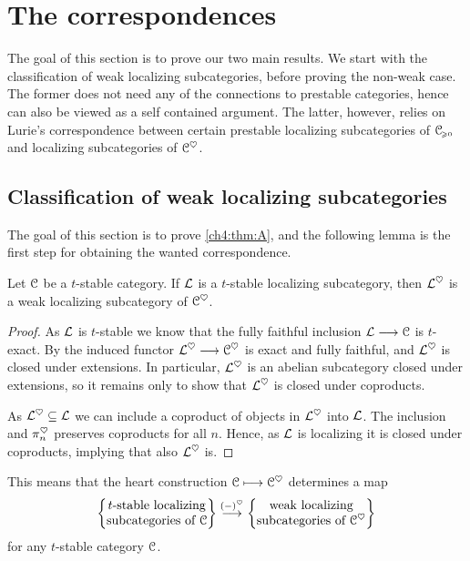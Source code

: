 

\section{The correspondences}

The goal of this section is to prove our two main results. We start with the classification of weak localizing subcategories, before proving the non-weak case. The former does not need any of the connections to prestable categories, hence can also be viewed as a self contained argument. The latter, however, relies on Lurie's correspondence between certain prestable localizing subcategories of $\EuScript{C}_{\hspace{-1pt}\scriptscriptstyle\geqslant 0}$ and localizing subcategories of $\EuScript{C}^\heartsuit$. 


\subsection{Classification of weak localizing subcategories}
\label{ch4:ssec:classificartion-weak-localizing}

The goal of this section is to prove \cref{ch4:thm:A}, and the following lemma is the first step for obtaining the wanted correspondence. 

\begin{lemma}
    \label{ch4:lm:t-stable-then-weak-localizing-heart}
    Let $\EuScript{C}$ be a $t$-stable category. If $\mathcal{L}$ is a $t$-stable localizing subcategory, then $\mathcal{L}^\heartsuit$ is a weak localizing subcategory of $\EuScript{C}^\heartsuit$. 
\end{lemma}
\begin{proof}
    As $\mathcal{L}$ is $t$-stable we know that the fully faithful inclusion $\mathcal{L}\longrightarrow \EuScript{C}$ is $t$-exact. By \cite[2.19]{antieau-gepner-heller_2019} the induced functor $\mathcal{L}^\heartsuit\longrightarrow\EuScript{C}^\heartsuit$ is exact and fully faithful, and $\mathcal{L}^\heartsuit$ is closed under extensions. In particular, $\mathcal{L}^\heartsuit$ is an abelian subcategory closed under extensions, so it remains only to show that $\mathcal{L}^\heartsuit$ is closed under coproducts.

    As $\mathcal{L}^\heartsuit \subseteq \mathcal{L}$ we can include a coproduct of objects in $\mathcal{L}^\heartsuit$ into $\mathcal{L}$. The inclusion and $\pi_n^\heartsuit$ preserves coproducts for all $n$. Hence, as $\mathcal{L}$ is localizing it is closed under coproducts, implying that also $\mathcal{L}^\heartsuit$ is. 
\end{proof}

This means that the heart construction $\EuScript{C} \longmapsto \EuScript{C}^\heartsuit$ determines a map
\[\left\{ \begin{matrix} t\text{-stable localizing}\\ \text{subcategories of }\EuScript{C} \end{matrix} \right\}\overset{(-)^\heartsuit}{\longrightarrow} \left\{ \begin{matrix} \text{weak localizing}\\ \text{subcategories of }\EuScript{C}^\heartsuit \end{matrix} \right\}\] 
for any $t$-stable category $\EuScript{C}$. 

